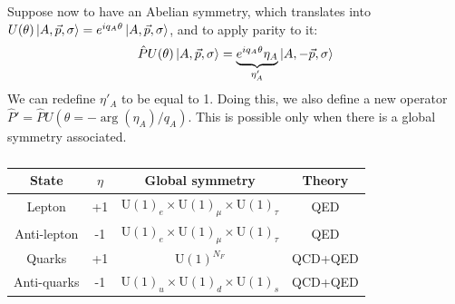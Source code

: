 \documentclass[../main.tex]{subfiles}
\begin{document}
Suppose now to have an Abelian symmetry, which translates into $U(\theta)\ket{A,\Vec{p},\sigma}=e^{iq_A\theta}\ket{A,\Vec{p},\sigma}$, and to apply parity to it:
\[
\hat{P}U(\theta)\ket{A,\Vec{p},\sigma}=\underbrace{e^{iq_A\theta}\eta_A}_{\eta'_A}\ket{A,-\Vec{p},\sigma}
\]
We can redefine $\eta'_A$ to be equal to 1. Doing this, we also define a new operator $\hat{P}'=\hat{P}U(\theta=-\arg(\eta_A)/q_A)$. This is possible only when there is a global symmetry associated.
\begin{table}[h]
    \centering
    \begin{tabular}{c|c|c|c}
    \rowcolor{gray!45}State & $\eta$ & Global symmetry & Theory\\
    \hline
    Lepton & +1 & U$(1)_e\times$U$(1)_\mu\times$U$(1)_\tau$ & QED\\
    Anti-lepton & -1 & U$(1)_e\times$U$(1)_\mu\times$U$(1)_\tau$ & QED\\
    Quarks & +1 & U$(1)^{N_F}$ & QCD+QED\\
    Anti-quarks & -1 & U$(1)_u\times$U$(1)_d\times$U$(1)_s$ & QCD+QED\\
    \hline
    \end{tabular}
    \caption*{}
\end{table}
\end{document}
